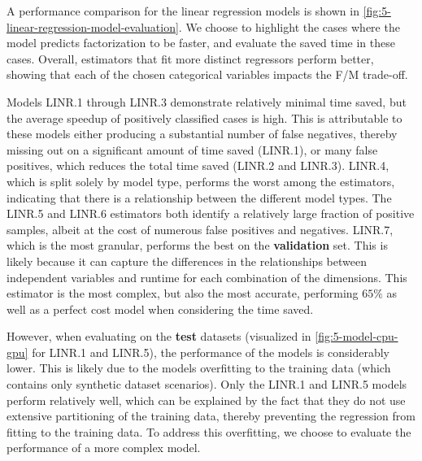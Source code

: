 A performance comparison for the linear regression models is shown in \autoref{fig:5-linear-regression-model-evaluation}. We choose to highlight the cases where the model predicts factorization to be faster, and evaluate the saved time in these cases. Overall, estimators that fit more distinct regressors perform better, showing that each of the chosen categorical variables impacts the F/M trade-off.

Models LINR.1 through LINR.3 demonstrate relatively minimal time saved, but the average speedup of positively classified cases is high. This is attributable to these models either producing a substantial number of false negatives, thereby missing out on a significant amount of time saved (LINR.1), or many false positives, which reduces the total time saved (LINR.2 and LINR.3). LINR.4, which is split solely by model type, performs the worst among the estimators, indicating that there is a relationship between the different model types. The LINR.5 and LINR.6 estimators both identify a relatively large fraction of positive samples, albeit at the cost of numerous false positives and negatives. LINR.7, which is the most granular, performs the best on the \textbf{validation} set. This is likely because it can capture the differences in the relationships between independent variables and runtime for each combination of the dimensions. This estimator is the most complex, but also the most accurate, performing $65\%$ as well as a perfect cost model when considering the time saved.

However, when evaluating on the \textbf{test} datasets (visualized in \autoref{fig:5-model-cpu-gpu} for LINR.1 and LINR.5), the performance of the models is considerably lower. This is likely due to the models overfitting to the training data (which contains only synthetic dataset scenarios). Only the LINR.1 and LINR.5 models perform relatively well, which can be explained by the fact that they do not use extensive partitioning of the training data, thereby preventing the regression from fitting to the training data. To address this overfitting, we choose to evaluate the performance of a more complex model.


